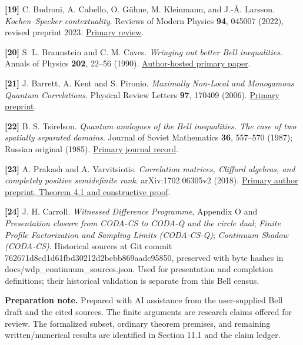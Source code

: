 \documentclass[
]{article}
\begin{document}
\textbf{{[}19{]}} C. Budroni, A. Cabello, O. Gühne, M. Kleinmann, and J.-Å. Larsson. \emph{Kochen--Specker contextuality}. Reviews of Modern Physics \textbf{94}, 045007 (2022), revised preprint 2023. \href{https://arxiv.org/abs/2102.13036}{Primary review}.

\textbf{{[}20{]}} S. L. Braunstein and C. M. Caves. \emph{Wringing out better Bell inequalities}. Annals of Physics \textbf{202}, 22--56 (1990). \href{https://www-users.york.ac.uk/~sb54/papers/90/bcB90.pdf}{Author-hosted primary paper}.

\textbf{{[}21{]}} J. Barrett, A. Kent and S. Pironio. \emph{Maximally Non-Local and Monogamous Quantum Correlations}. Physical Review Letters \textbf{97}, 170409 (2006). \href{https://arxiv.org/abs/quant-ph/0605182}{Primary preprint}.

\textbf{{[}22{]}} B. S. Tsirelson. \emph{Quantum analogues of the Bell inequalities. The case of two spatially separated domains}. Journal of Soviet Mathematics \textbf{36}, 557--570 (1987); Russian original (1985). \href{https://www.mathnet.ru/php/archive.phtml?jrnid=znsl&option_lang=eng&paperid=4332&wshow=paper}{Primary journal record}.

\textbf{{[}23{]}} A. Prakash and A. Varvitsiotis. \emph{Correlation matrices, Clifford algebras, and completely positive semidefinite rank}. arXiv:1702.06305v2 (2018). \href{https://arxiv.org/html/1702.06305v2}{Primary author preprint, Theorem 4.1 and constructive proof}.

\textbf{{[}24{]}} J. H. Carroll. \emph{Witnessed Difference Programme}, Appendix O and
\emph{Presentation closure from CODA-CS to CODA-Q and the circle dual};
\emph{Finite Profile Factorization and Sampling Limits (CODA-CS-Q)};
\emph{Continuum Shadow (CODA-CS)}. Historical sources at Git commit
762671d8cd1d61fbd30212d2bebb869aadc95850, preserved with byte hashes in
docs/wdp\_continuum\_sources.json. Used for presentation and completion
definitions; their historical validation is separate from this Bell census.

\textbf{Preparation note.} Prepared with AI assistance from the user-supplied Bell draft and the cited sources. The finite arguments are research claims offered for review. The formalized subset, ordinary theorem premises, and remaining written/numerical results are identified in Section 11.1 and the claim ledger.
\end{document}
